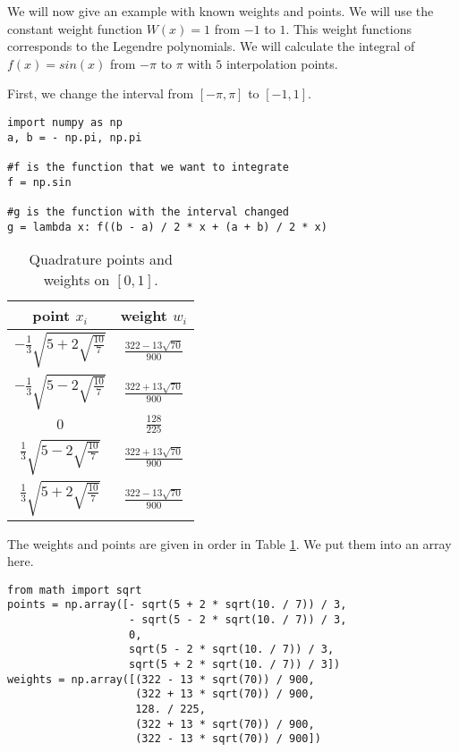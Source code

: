 We will now give an example with known weights and points.
We will use the constant weight function $W(x) = 1$ from $-1$ to $1$.
This weight functions corresponds to the Legendre polynomials.
We will calculate the integral of $f(x) = sin(x)$ from $-\pi$ to $\pi$ with $5$ interpolation points.

First, we change the interval from $[-\pi, \pi]$ to $[-1,1]$.

\begin{lstlisting}
import numpy as np
a, b = - np.pi, np.pi

#f is the function that we want to integrate
f = np.sin

#g is the function with the interval changed
g = lambda x: f((b - a) / 2 * x + (a + b) / 2 * x)
\end{lstlisting}

\begin{table}[h!]
\begin{center}
\begin{tabular}{|c|c|}
\hline
point $x_i$ & weight $w_i$ \\
\hline
$-\frac{1}{3}\sqrt{5 + 2\sqrt{\frac{10}{7}}}$ &  $\frac{322-13\sqrt{70}}{900}$ \\
\hline
$-\frac{1}{3}\sqrt{5 - 2\sqrt{\frac{10}{7}}}$ & $\frac{322+13\sqrt{70}}{900}$ \\
\hline
$0$ & $\frac{128}{225}$ \\
\hline
$\frac{1}{3}\sqrt{5 - 2\sqrt{\frac{10}{7}}}$ & $\frac{322+13\sqrt{70}}{900}$ \\
\hline
$\frac{1}{3}\sqrt{5 + 2\sqrt{\frac{10}{7}}}$ & $\frac{322-13\sqrt{70}}{900}$ \\
\hline
\end{tabular}
\end{center}
\caption{Quadrature points and weights on $\left[0, 1\right]$.}
\label{intro_table}
\end{table}

The weights and points are given in order in Table \ref{intro_table}.
We put them into an array here.

\begin{lstlisting}
from math import sqrt
points = np.array([- sqrt(5 + 2 * sqrt(10. / 7)) / 3,
                   - sqrt(5 - 2 * sqrt(10. / 7)) / 3,
                   0,
                   sqrt(5 - 2 * sqrt(10. / 7)) / 3,
                   sqrt(5 + 2 * sqrt(10. / 7)) / 3])
weights = np.array([(322 - 13 * sqrt(70)) / 900,
                    (322 + 13 * sqrt(70)) / 900,
                    128. / 225,
                    (322 + 13 * sqrt(70)) / 900,
                    (322 - 13 * sqrt(70)) / 900])
\end{lstlisting}

